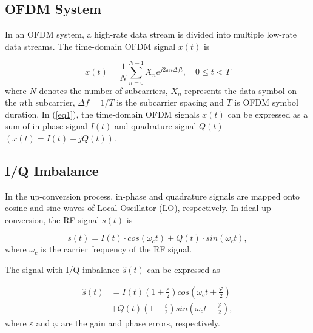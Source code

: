 \documentclass[lettersize,journal]{IEEEtran}
\begin{document}
\subsection{OFDM System}
In an OFDM system, a high-rate data stream is divided into multiple low-rate data streams.
The time-domain OFDM signal $x(t)$ is \cite{Prasad}

\begin{equation}
\label{eq1}
x(t) = \frac{1}{N}\sum_{n=0}^{N-1} X_{n} e^{j2\pi n\Delta ft}, \quad 0 \leq t < T
\end{equation}
where $N$ denotes the number of subcarriers, $X_n$ represents the data symbol on the $n$th subcarrier, $\Delta f =1/T$ is the subcarrier spacing and $T$ is OFDM symbol duration.
In (\ref{eq1}), the time-domain OFDM signals $x(t)$ can be expressed as a sum of in-phase signal $I(t)$ and quadrature signal $Q(t)$ $(x(t) = I(t) + jQ(t))$.

\subsection{I/Q Imbalance}
In the up-conversion process, in-phase and quadrature signals are mapped onto cosine and sine waves of Local Oscillator (LO), respectively.
In ideal up-conversion, the RF signal $s(t)$ is

\begin{equation}
\label{eq2}
s(t) = I(t) \cdot cos(\omega_c t) + Q(t) \cdot sin(\omega_c t), 
\end{equation}
where $\omega_c$ is the carrier frequency of the RF signal.


The signal with I/Q imbalance $\hat s(t)$ can be expressed as \cite{Razavi}

\begin{equation}
\label{eq3}
\begin{split}
\hat s(t) 
&= I(t) \left(1+\frac{\varepsilon}{2}\right) cos \left(\omega_c t + \frac{\varphi}{2}\right) \\
&+ Q(t) \left(1-\frac{\varepsilon}{2}\right) sin\left(\omega_c t - \frac{\varphi}{2}\right), 
\end{split}
\end{equation}
where $\varepsilon$ and $\varphi$ are the gain and phase errors, respectively.
\end{document}
